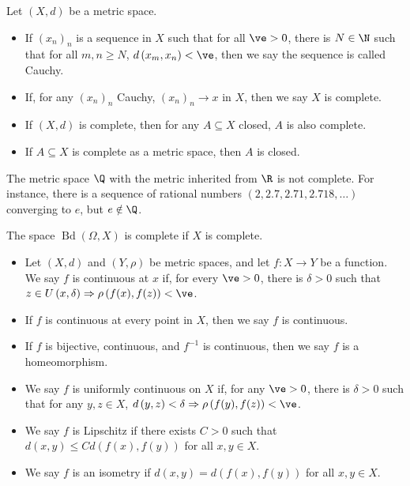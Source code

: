 \begin{definition}[Completeness]
  Let $\left(X,d\right)$ be a metric space.
  \begin{itemize}
    \item If $\left(x_n\right)_n$ is a sequence in $X$ such that for all $\ve > 0$, there is $N\in \N$ such that for all $m,n\geq N$, $d\left(x_m,x_n\right) < \ve$, then we say the sequence is called Cauchy.
    \item If, for any $\left(x_n\right)_n$ Cauchy, $\left(x_n\right)_n\rightarrow x$ in $X$, then we say $X$ is complete.
    \item If $\left(X,d\right)$ is complete, then for any $A\subseteq X$ closed, $A$ is also complete.
    \item If $A\subseteq X$ is complete as a metric space, then $A$ is closed.
  \end{itemize}
\end{definition}
\begin{example}
  The metric space $\Q$ with the metric inherited from $\R$ is not complete. For instance, there is a sequence of rational numbers $\left(2,2.7,2.71,2.718,\dots\right)$ converging to $e$, but $e\notin \Q$.\newline

  The space $\operatorname{Bd}\left(\Omega,X\right)$ is complete if $X$ is complete.
\end{example}
\begin{definition}[Continuity]
  \begin{itemize}
    \item Let $\left(X,d\right)$ and $\left(Y,\rho\right)$ be metric spaces, and let $f\colon X\rightarrow Y$ be a function. We say $f$ is continuous at $x$ if, for every $\ve > 0$, there is $\delta > 0$ such that $z\in U\left(x,\delta\right)\Rightarrow \rho\left(f(x),f(z)\right) < \ve$.
    \item If $f$ is continuous at every point in $X$, then we say $f$ is continuous.
    \item If $f$ is bijective, continuous, and $f^{-1}$ is continuous, then we say $f$ is a homeomorphism.
    \item We say $f$ is uniformly continuous on $X$ if, for any $\ve > 0$, there is $\delta > 0$ such that for any $y,z\in X$, $d\left(y,z\right) < \delta \Rightarrow \rho\left(f(y),f(z)\right) < \ve$.
    \item We say $f$ is Lipschitz if there exists $C > 0$ such that $d\left(x,y\right) \leq Cd\left(f(x),f(y)\right)$ for all $x,y\in X$.
    \item We say $f$ is an isometry if $d\left(x,y\right) = d\left(f(x),f(y)\right)$ for all $x,y\in X$.
  \end{itemize}
\end{definition}
